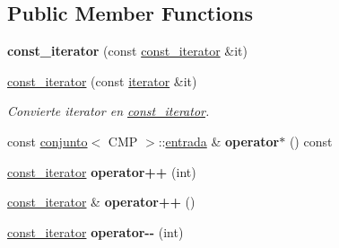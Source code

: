 \subsection*{Public Member Functions}
\begin{DoxyCompactItemize}
\item 
\hypertarget{classconjunto_1_1const__iterator_ac945cf4d38b5131ea168957f557386e5}{}{\bfseries const\+\_\+iterator} (const \hyperlink{classconjunto_1_1const__iterator}{const\+\_\+iterator} \&it)\label{classconjunto_1_1const__iterator_ac945cf4d38b5131ea168957f557386e5}

\item 
\hypertarget{classconjunto_1_1const__iterator_a5aca83d43f8232ef0604d4e6f84fd2be}{}\hyperlink{classconjunto_1_1const__iterator_a5aca83d43f8232ef0604d4e6f84fd2be}{const\+\_\+iterator} (const \hyperlink{classconjunto_1_1iterator}{iterator} \&it)\label{classconjunto_1_1const__iterator_a5aca83d43f8232ef0604d4e6f84fd2be}

\begin{DoxyCompactList}\small\item\em Convierte iterator en \hyperlink{classconjunto_1_1const__iterator}{const\+\_\+iterator}. \end{DoxyCompactList}\item 
\hypertarget{classconjunto_1_1const__iterator_a81266f325c36edccc0a2c05fd0cc7cda}{}const \hyperlink{classconjunto}{conjunto}$<$ C\+M\+P $>$\+::\hyperlink{classconjunto_a7630ace7cb17bcec07daf5804f1a0780}{entrada} \& {\bfseries operator$\ast$} () const \label{classconjunto_1_1const__iterator_a81266f325c36edccc0a2c05fd0cc7cda}

\item 
\hypertarget{classconjunto_1_1const__iterator_a9ab281204402103f6d674986eb63f80d}{}\hyperlink{classconjunto_1_1const__iterator}{const\+\_\+iterator} {\bfseries operator++} (int)\label{classconjunto_1_1const__iterator_a9ab281204402103f6d674986eb63f80d}

\item 
\hypertarget{classconjunto_1_1const__iterator_addf381813df873871ef3b56d04da3fc5}{}\hyperlink{classconjunto_1_1const__iterator}{const\+\_\+iterator} \& {\bfseries operator++} ()\label{classconjunto_1_1const__iterator_addf381813df873871ef3b56d04da3fc5}

\item 
\hypertarget{classconjunto_1_1const__iterator_a1603a6055e10f265ca251f761eceeca4}{}\hyperlink{classconjunto_1_1const__iterator}{const\+\_\+iterator} {\bfseries operator-\/-\/} (int)\label{classconjunto_1_1const__iterator_a1603a6055e10f265ca251f761eceeca4}


\end{DoxyCompactItemize}
